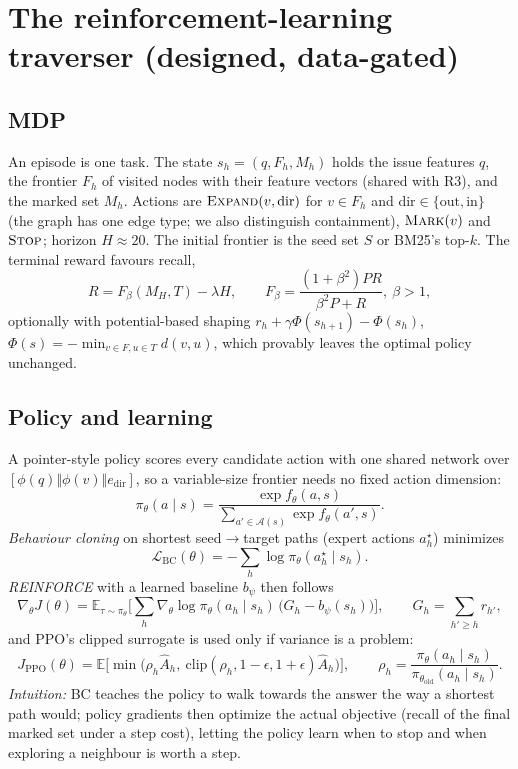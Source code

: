 \documentclass[10pt,a4paper]{article}
\newcommand{\E}{\mathbb{E}}
\newcommand{\1}{\mathbb{1}}
\begin{document}
\section{The reinforcement-learning traverser (designed, data-gated)}
\subsection{MDP}
An episode is one task. The state $s_h=(q,F_h,M_h)$ holds the issue features $q$, the frontier $F_h$ of visited
nodes with their feature vectors (shared with R3), and the marked set $M_h$. Actions are
$\textsc{Expand}(v,\text{dir})$ for $v\in F_h$ and $\text{dir}\in\{\text{out},\text{in}\}$ (the graph has one edge type; we also
distinguish containment), $\textsc{Mark}(v)$ and $\textsc{Stop}$; horizon $H\approx20$. The initial frontier is the seed set
$S$ or BM25's top-$k$. The terminal reward favours recall,
\[
R=F_\beta(M_H,T)-\lambda H,\qquad F_\beta=\frac{(1+\beta^2)PR}{\beta^2P+R},\ \beta>1,
\]
optionally with potential-based shaping $r_h+\gamma\Phi(s_{h+1})-\Phi(s_h)$, $\Phi(s)=-\min_{v\in F,u\in T}d(v,u)$, which
provably leaves the optimal policy unchanged.
\subsection{Policy and learning}
A pointer-style policy scores every candidate action with one shared network over
$[\phi(q)\Vert\phi(v)\Vert e_\text{dir}]$, so a variable-size frontier needs no fixed action dimension:
\[
\pi_\theta(a\mid s)=\frac{\exp f_\theta(a,s)}{\sum_{a'\in\mathcal A(s)}\exp f_\theta(a',s)}.
\]
\emph{Behaviour cloning} on shortest seed$\to$target paths (expert actions $a_h^\star$) minimizes
\[
\mathcal L_\text{BC}(\theta)=-\sum_h\log\pi_\theta(a_h^\star\mid s_h).
\]
\emph{REINFORCE} with a learned baseline $b_\psi$ then follows
\[
\nabla_\theta J(\theta)=\E_{\tau\sim\pi_\theta}\Big[\sum_h\nabla_\theta\log\pi_\theta(a_h\mid s_h)\,\big(G_h-b_\psi(s_h)\big)\Big],\qquad G_h=\sum_{h'\ge h}r_{h'},
\]
and PPO's clipped surrogate is used only if variance is a problem:
\[
J_\text{PPO}(\theta)=\E\big[\min\big(\rho_h\hat A_h,\ \text{clip}(\rho_h,1-\epsilon,1+\epsilon)\hat A_h\big)\big],\qquad \rho_h=\frac{\pi_\theta(a_h\mid s_h)}{\pi_{\theta_\text{old}}(a_h\mid s_h)}.
\]
\emph{Intuition:} BC teaches the policy to walk towards the answer the way a shortest path would; policy
gradients then optimize the actual objective (recall of the final marked set under a step cost), letting the
policy learn when to stop and when exploring a neighbour is worth a step.
\end{document}

